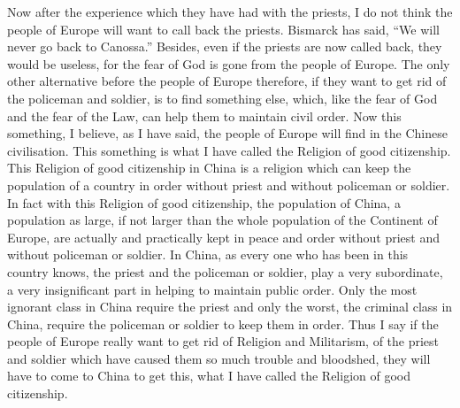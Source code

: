 Now after the experience which they have had with the priests, I do not think the people of Europe will want to call back the priests. Bismarck has said, ``We will never go back to Canossa.''
Besides, even if the priests are now called back, they would be useless,
for the fear of God is gone from the people of Europe.
The only other alternative before the people of Europe therefore,
if they want to get rid of the policeman and soldier,
is to find something else, which, like the fear of God and the fear of the Law, can help them to maintain civil order.
Now this something, I believe, as I have said, the people of Europe will find in the Chinese civilisation.
This something is what I have called the Religion of good citizenship.
This Religion of good citizenship in China is a religion which can keep the population of a country in order without priest and without policeman or soldier.
In fact with this Religion of good citizenship, the population of China, a population as large, if not larger than the whole population of the Continent of Europe, are actually and practically kept in peace and order without priest and without policeman or soldier.
In China, as every one who has been in this country knows, the priest and the policeman or soldier, play a very subordinate, a very insignificant part in helping to maintain public order.
Only the most ignorant class in China require the priest and only the worst, the criminal class in China,
require the policeman or soldier to keep them in order.
Thus I say if the people of Europe really want to get rid of Religion and Militarism,
of the priest and soldier which have caused them so much trouble and bloodshed,
they will have to come to China to get this, what I have called the Religion of good citizenship.

